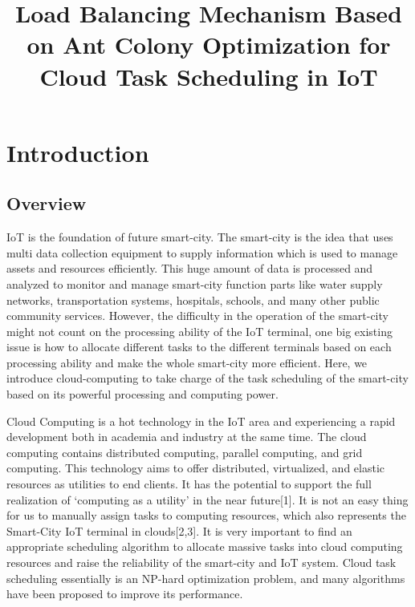 \documentclass[conference]{IEEEtran}
\begin{document}
\title{Load Balancing Mechanism Based on Ant Colony Optimization for Cloud Task Scheduling in IoT\\
{
}
}

\author{
\and
{}
}

\maketitle

\section{Introduction}
\subsection{Overview}
IoT is the foundation of future smart-city. The smart-city is the idea that uses multi data collection equipment to supply information which is used to manage assets and resources efficiently. This huge amount of data is processed and analyzed to monitor and manage smart-city function parts like water supply networks, transportation systems, hospitals, schools, and many other public community services. However, the difficulty in the operation of the smart-city might not count on the processing ability of the IoT terminal, one big existing issue is how to allocate different tasks to the different terminals based on each processing ability and make the whole smart-city more efficient. Here, we introduce cloud-computing to take charge of the task scheduling of the smart-city based on its powerful processing and computing power.

Cloud Computing is a hot technology in the IoT area and experiencing a rapid development both in academia and industry at the same time. The cloud computing contains distributed computing, parallel computing, and grid computing. This technology aims to offer distributed, virtualized, and elastic resources as utilities to end clients. It has the potential to support the full realization of ‘computing as a utility’ in the near future[1]. It is not an easy thing for us to manually assign tasks to computing resources, which also represents the Smart-City IoT terminal in clouds[2,3]. It is very important to find an appropriate scheduling algorithm to allocate massive tasks into cloud computing resources and raise the reliability of the smart-city and IoT system. Cloud task scheduling essentially is an NP-hard optimization problem, and many algorithms have been proposed to improve its performance.
\end{document}
